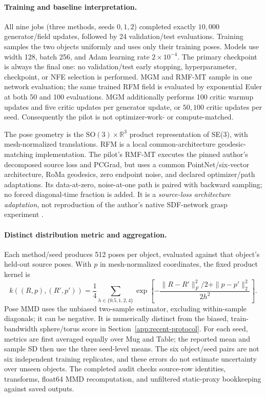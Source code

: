 \paragraph{Training and baseline interpretation.}
All nine jobs (three methods, seeds $0,1,2$) completed exactly $10{,}000$
generator/field updates, followed by 24 validation/test evaluations. Training
samples the two objects uniformly and uses only their training poses. Models
use width 128, batch 256, and Adam learning rate $2\times10^{-4}$. The primary
checkpoint is always the final one: no validation/test early stopping,
hyperparameter, checkpoint, or NFE selection is performed. MGM and RMF-MT
sample in one network evaluation; the same trained RFM field
\citep{chen2024general} is evaluated by exponential Euler at both 50 and 100
evaluations. MGM additionally performs 100 critic warmup updates and five
critic updates per generator update, or $50{,}100$ critic updates per seed.
Consequently the pilot is not optimizer-work- or compute-matched.

The pose geometry is the $\mathrm{SO}(3)\times\mathbb R^3$ product
representation of SE(3), with mesh-normalized translations. RFM is a local
common-architecture geodesic-matching implementation. The pilot's RMF-MT
executes the pinned author's decomposed source loss and PCGrad, but uses a
common PointNet/six-vector architecture, RoMa geodesics, zero endpoint noise,
and declared optimizer/path adaptations. Its data-at-zero, noise-at-one path
is paired with backward sampling; no forced diagonal-time fraction is added.
It is a \emph{source-loss architecture adaptation}, not reproduction of the
author's native SDF-network grasp experiment \citep{zhong2026rmf}.

\paragraph{Distinct distribution metric and aggregation.}
Each method/seed produces 512 poses per object, evaluated against that object's
held-out source poses. With $p$ in mesh-normalized coordinates, the fixed
product kernel is
\begin{equation}
k((R,p),(R',p'))=\frac14\sum_{h\in\{0.5,1,2,4\}}
\exp\!\left[-\frac{\|R-R'\|_F^2/2+\|p-p'\|_2^2}{2h^2}\right].
\end{equation}
Pose MMD uses the unbiased two-sample estimator, excluding within-sample
diagonals; it can be negative. It is numerically distinct from the biased,
train-bandwidth sphere/torus score in Section~\ref{app:recent-protocol}.
For each seed, metrics are first averaged equally over Mug and Table; the
reported mean and sample SD then use the three seed-level means. The six
object/seed pairs are not six independent training replicates, and these
errors do not estimate uncertainty over unseen objects. The completed audit
checks source-row identities, transforms, float64 MMD recomputation, and
unfiltered static-proxy bookkeeping against saved outputs.

